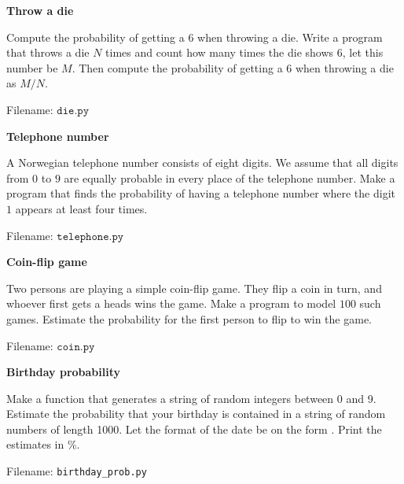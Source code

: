 
\begin{Problem}{\textbf{Throw a die}}

\noindent Compute the probability of getting a $6$ when throwing a die. Write a program
that throws a die $N$ times and count how many times the die shows $6$, let this
number be $M$. Then compute the probability of getting a $6$ when throwing a die
as $M/N$.

Filename: $\texttt{die.py}$
\end{Problem}

\begin{Problem}{\textbf{Telephone number}}

\noindent A Norwegian telephone  number consists of eight digits. We assume that all digits
from $0$ to $9$ are equally probable in every place of the telephone number.
Make a program that finds the probability of having a telephone number where the
digit $1$ appears at least four times.

Filename: $\texttt{telephone.py}$
\end{Problem}

\begin{Problem}{\textbf{Coin-flip game}}

\noindent Two persons are playing a simple coin-flip game. They flip a coin in turn,
and whoever first gets a heads wins the game. Make a program to model $100$ such
games. Estimate the probability for the first person to flip to win the game.

Filename: $\texttt{coin.py}$
\end{Problem}

\begin{Problem}{\textbf{Birthday probability}}

\noindent Make a function that generates a string of random integers between 0 and 9.
Estimate the probability that your birthday is contained in a string of random
numbers of length 1000. Let the format of the date be on the form .
Print the estimates in \%.

Filename: \texttt{birthday\_prob.py}
\end{Problem}
\newpage

